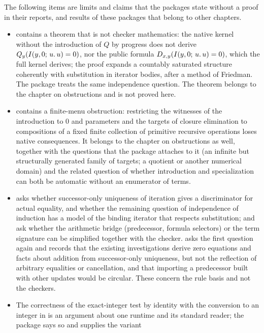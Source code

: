 The following items are limits and claims that the packages state without a
proof in their reports, and results of these packages that belong to other
chapters.
\begin{itemize}
\item {} contains a theorem that is not checker mathematics:
the native kernel without the introduction of $Q$ by progress does not derive
$Q_{y}(I(y,0;\,u.\,u)=0)$, nor the public formula
$D_{x,y}(I(y,0;\,u.\,u)=0)$, which the full kernel derives; the proof
expands a countably saturated structure coherently with substitution in
iterator bodies, after a method of Friedman. The package
 treats the same independence question. The
theorem belongs to the chapter on obstructions and is not proved here.
\item {} contains a finite-menu obstruction: restricting
the witnesses of the introduction to $0$ and parameters and the targets of
closure elimination to compositions of a fixed finite collection of
primitive recursive operations loses native consequences. It belongs to the
chapter on obstructions as well, together with the questions that the package
attaches to it (an infinite but structurally generated family of targets; a
quotient or another numerical domain) and the related question of
 whether introduction and specialization can both be
automatic without an enumerator of terms.
\item {} asks whether successor-only uniqueness of
iteration gives a discriminator for actual equality, and whether the
remaining question of independence of induction has a model of the binding
iterator that respects substitution;  and
 ask whether the arithmetic bridge (predecessor, formula
selectors) or the term signature can be simplified together with the checker.
 asks the first question again and records that
the existing investigations derive zero equations and facts about addition
from successor-only uniqueness, but not the reflection of arbitrary
equalities or cancellation, and that importing a predecessor built with
other updates would be circular. These concern the rule basis and not the
checkers.
\item The correctness of the exact-integer test by identity with the
conversion to an integer in  is an argument about one
runtime and its standard reader; the package says so and supplies the variant

\end{itemize}
